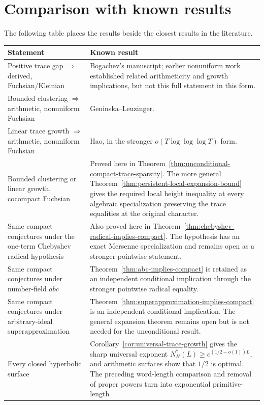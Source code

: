 \documentclass[11pt,reqno]{amsart}
\theoremstyle{definition}
\theoremstyle{remark}
\begin{document}
\section{Comparison with known results}

The following table places the results beside the closest results in the
literature.
\begin{center}
\begin{tabular}{p{}p{}}
\toprule
Statement & Known result \\
\midrule
Positive trace gap \(\Rightarrow\) derived, Fuchsian/Kleinian
& Bogachev's manuscript; earlier nonuniform work established related
arithmeticity and growth implications, but not this full statement in this
form.\\
Bounded clustering \(\Rightarrow\) arithmetic, nonuniform Fuchsian
& Geninska--Leuzinger.\\
Linear trace growth \(\Rightarrow\) arithmetic, nonuniform Fuchsian
& Hao, in the stronger \(o(T\log\log\log T)\) form.\\
Bounded clustering or linear growth, cocompact Fuchsian
& Proved here in
Theorem~\ref{thm:unconditional-compact-trace-sparsity}.  The more general
Theorem~\ref{thm:persistent-local-expansion-bound} gives the required local
height inequality at every algebraic specialization preserving the trace
equalities at the original character.\\
Same compact conjectures under the one-term Chebyshev radical hypothesis
& Also proved here in
Theorem~\ref{thm:chebyshev-radical-implies-compact}.  The hypothesis has
an exact Mersenne specialization and remains open as a stronger pointwise
statement.\\
Same compact conjectures under number-field \(abc\)
& Theorem~\ref{thm:abc-implies-compact} is retained as an independent
conditional implication through the stronger pointwise radical equality.\\
Same compact conjectures under arbitrary-ideal superapproximation
& Theorem~\ref{thm:superapproximation-implies-compact} is an independent
conditional implication.  The general expansion theorem remains open but is not
needed for the unconditional result.\\
Every closed hyperbolic surface
& Corollary~\ref{cor:universal-trace-growth} gives the sharp universal
exponent \(N_H^*(L)\ge e^{(1/2-o(1))L}\), and arithmetic surfaces show that
\(1/2\) is optimal.  The preceding word-length comparison and removal of
proper powers turn \cite[Theorem~1.2]{BCLM} into exponential primitive-length

\end{tabular}
\end{center}
\end{document}
